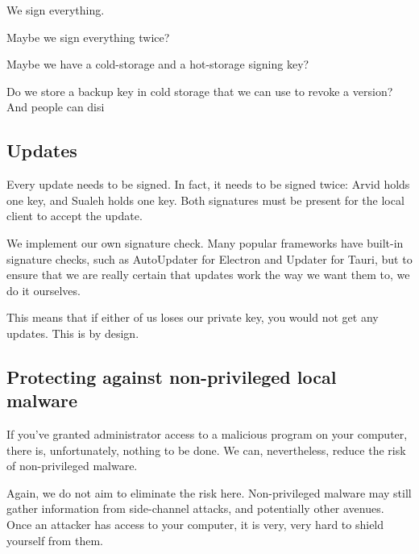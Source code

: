 We sign everything.

Maybe we sign everything twice?

Maybe we have a cold-storage and a hot-storage signing key?

Do we store a backup key in cold storage that we can use to revoke a version? And people can disi


\subsection{Updates}

Every update needs to be signed. In fact, it needs to be signed twice: Arvid holds one key, and Sualeh holds one key. Both signatures must be present for the local client to accept the update.

We implement our own signature check. Many popular frameworks have built-in signature checks, such as AutoUpdater for Electron and Updater for Tauri, but to ensure that we are really certain that updates work the way we want them to, we do it ourselves.

This means that if either of us loses our private key, you would not get any updates. This is by design.

\subsection{Protecting against non-privileged local malware}

If you've granted administrator access to a malicious program on your computer, there is, unfortunately, nothing to be done. We can, nevertheless, reduce the risk of non-privileged malware.


Again, we do not aim to eliminate the risk here. Non-privileged malware may still gather information from side-channel attacks, and potentially other avenues. Once an attacker has access to your computer, it is very, very hard to shield yourself from them.